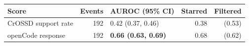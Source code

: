 \begin{tabular}{lrlrr}
\toprule
Score & Events & AUROC (95\% CI) & Starred & Filtered \\
\midrule
CrOSSD support rate & 192 & 0.42 (0.37, 0.46) & 0.38 & (0.53) \\
openCode response & 192 & \textbf{0.66 (0.63, 0.69)} & 0.68 & (0.62) \\
\bottomrule
\end{tabular}
